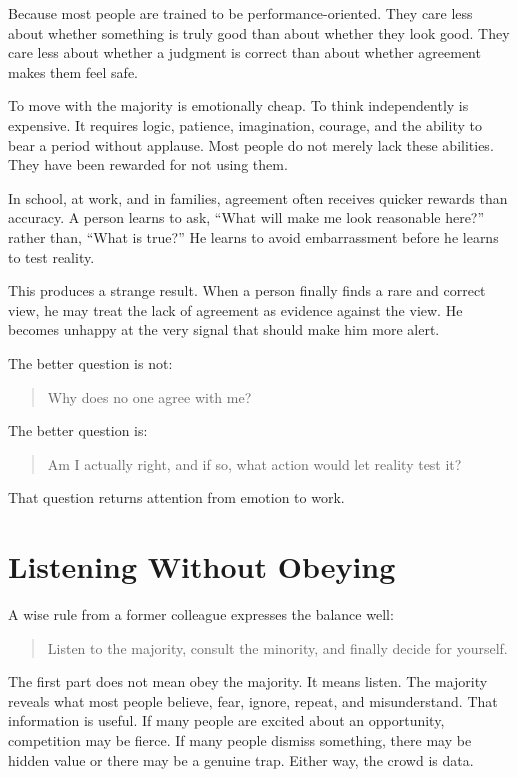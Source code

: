 Because most people are trained to be performance-oriented. They care less about whether something is truly good than about whether they look good. They care less about whether a judgment is correct than about whether agreement makes them feel safe.

To move with the majority is emotionally cheap. To think independently is expensive. It requires logic, patience, imagination, courage, and the ability to bear a period without applause. Most people do not merely lack these abilities. They have been rewarded for not using them.

In school, at work, and in families, agreement often receives quicker rewards than accuracy. A person learns to ask, ``What will make me look reasonable here?'' rather than, ``What is true?'' He learns to avoid embarrassment before he learns to test reality.

This produces a strange result. When a person finally finds a rare and correct view, he may treat the lack of agreement as evidence against the view. He becomes unhappy at the very signal that should make him more alert.

The better question is not:

\begin{quote}
Why does no one agree with me?
\end{quote}

The better question is:

\begin{quote}
Am I actually right, and if so, what action would let reality test it?
\end{quote}

That question returns attention from emotion to work.

\section*{Listening Without Obeying}

A wise rule from a former colleague expresses the balance well:

\begin{quote}
Listen to the majority, consult the minority, and finally decide for yourself.
\end{quote}

The first part does not mean obey the majority. It means listen. The majority reveals what most people believe, fear, ignore, repeat, and misunderstand. That information is useful. If many people are excited about an opportunity, competition may be fierce. If many people dismiss something, there may be hidden value or there may be a genuine trap. Either way, the crowd is data.

